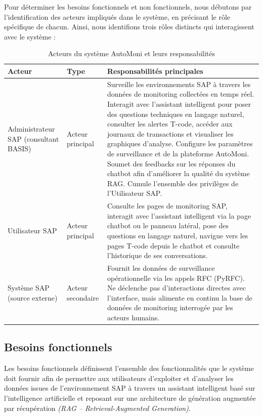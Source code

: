 Pour déterminer les besoins fonctionnels et non fonctionnels, nous débutons par
l'identification des acteurs impliqués dans le système, en précisant le rôle spécifique
de chacun. Ainsi, nous identifions trois rôles distincts qui interagissent avec le
système :

\begin{table}[H]
\centering
\renewcommand{\arraystretch}{1.45}
\caption{Acteurs du système AutoMoni et leurs responsabilités}
\label{tab:acteurs}
\begin{tabularx}{\textwidth}{|p{4.5cm}|p{3.5cm}|X|}
\hline
\textbf{Acteur} & \textbf{Type} & \textbf{Responsabilités principales} \\
\hline
Administrateur SAP (consultant BASIS)
  & Acteur principal
  & Surveille les environnements SAP à travers les données de monitoring collectées en temps réel. Interagit avec l'assistant intelligent pour poser des questions techniques en langage naturel, consulter les alertes T-code, accéder aux journaux de transactions et visualiser les graphiques d'analyse. Configure les paramètres de surveillance et de la plateforme AutoMoni. Soumet des feedbacks sur les réponses du chatbot afin d'améliorer la qualité du système RAG. Cumule l'ensemble des privilèges de l'Utilisateur SAP. \\
\hline
Utilisateur SAP
  & Acteur principal
  & Consulte les pages de monitoring SAP, interagit avec l'assistant intelligent via la page chatbot ou le panneau latéral, pose des questions en langage naturel, navigue vers les pages T-code depuis le chatbot et consulte l'historique de ses conversations. \\
\hline
Système SAP (source externe)
  & Acteur secondaire
  & Fournit les données de surveillance opérationnelle via les appels RFC (PyRFC). Ne déclenche pas d'interactions directes avec l'interface, mais alimente en continu la base de données de monitoring interrogée par les acteurs humains. \\
\hline
\end{tabularx}
\end{table}

\subsection{Besoins fonctionnels}

Les besoins fonctionnels définissent l'ensemble des fonctionnalités que le système doit
fournir afin de permettre aux utilisateurs d'exploiter et d'analyser les données issues
de l'environnement SAP à travers un assistant intelligent basé sur l'intelligence
artificielle et reposant sur une architecture de génération augmentée par récupération
\textit{(RAG -- Retrieval-Augmented Generation)}.

